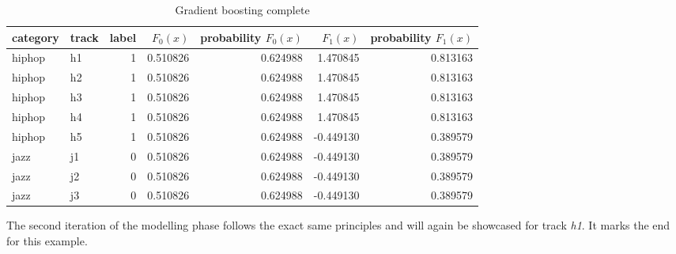 \begin{table}[H]
    \centering
    \begin{tabular}{llrrrrr}
        \toprule
        category & track &  label & \(F_{0}(x)\) &  probability \(F_{0}(x)\) &  \(F_{1}(x)\) &  probability \(F_{1}(x)\) \\
        \midrule
          hiphop &    h1 &      1 & 0.510826 &         0.624988 &  1.470845 &         0.813163 \\
          hiphop &    h2 &      1 & 0.510826 &         0.624988 &  1.470845 &         0.813163 \\
          hiphop &    h3 &      1 & 0.510826 &         0.624988 &  1.470845 &         0.813163 \\
          hiphop &    h4 &      1 & 0.510826 &         0.624988 &  1.470845 &         0.813163 \\
          hiphop &    h5 &      1 & 0.510826 &         0.624988 & -0.449130 &         0.389579 \\
            jazz &    j1 &      0 & 0.510826 &         0.624988 & -0.449130 &         0.389579 \\
            jazz &    j2 &      0 & 0.510826 &         0.624988 & -0.449130 &         0.389579 \\
            jazz &    j3 &      0 & 0.510826 &         0.624988 & -0.449130 &         0.389579 \\
        \bottomrule
        \end{tabular}
    \caption{Gradient boosting complete}%
    \label{tbl:theory_output_values_1_iteration}%
  \end{table} 

The second iteration of the modelling phase follows the exact same principles and will again be showcased for track \emph{h1}. 
It marks the end for this example. 

